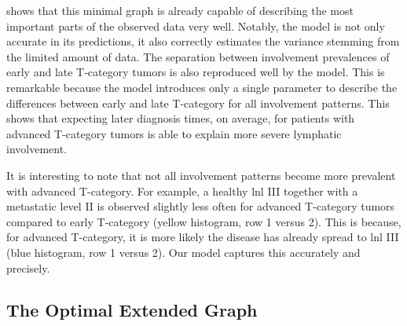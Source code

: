 \documentclass[twocolumn]{aastex631}
\begin{document}
 shows that this minimal graph is already capable of describing the most important parts of the observed data very well. Notably, the model is not only accurate in its predictions, it also correctly estimates the variance stemming from the limited amount of data. The separation between involvement prevalences of early and late T-category tumors is also reproduced well by the model. This is remarkable because the model introduces only a single parameter to describe the differences between early and late T-category for all involvement patterns. This shows that expecting later diagnosis times, on average, for patients with advanced T-category tumors is able to explain more severe lymphatic involvement.



It is interesting to note that not all involvement patterns become more prevalent with advanced T-category. For example, a healthy \gls{lnl} III together with a metastatic level II is observed slightly less often for advanced T-category tumors compared to early T-category (yellow histogram, row 1 versus 2). This is because, for advanced T-category, it is more likely the disease has already spread to \gls{lnl} III (blue histogram, row 1 versus 2). Our model captures this accurately and precisely.



\subsection{The Optimal Extended Graph}
\label{subsec:results:optimal_graph}

\begin{table}
    \centering
    \caption{Model comparison results from the base graph and the extended graph we chose as the ``winnning'' model. For both \glspl{dag} we show the log-evidence, computed via thermodynamic integration, the negative one half of the \gls{bic}, as well as the maximum log-likelihood that was encountered during the final \gls{mcmc} sampling round.}
    \label{table:evidence}
\end{table}
\end{document}
